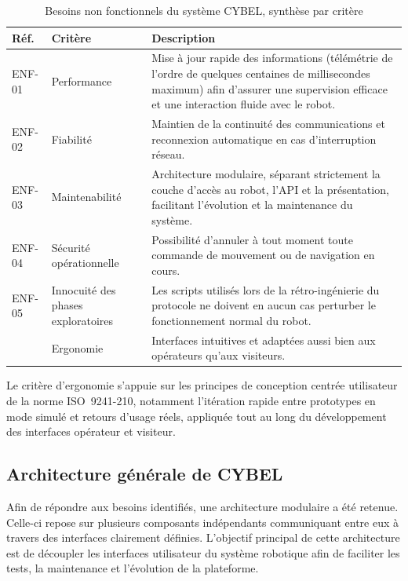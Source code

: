 \begin{table}[H]
\centering
\caption{Besoins non fonctionnels du système CYBEL, synthèse par critère}
\label{tab:besoins_non_fonctionnels_synth}
\begin{tabularx}{\textwidth}{|p{1.3cm}|p{3.3cm}|X|}
\hline
\textbf{Réf.} & \textbf{Critère} & \textbf{Description} \\
\hline
ENF-01 & Performance &
Mise à jour rapide des informations (télémétrie de l'ordre de quelques
centaines de millisecondes maximum) afin d'assurer une supervision efficace
et une interaction fluide avec le robot. \\
\hline
ENF-02 & Fiabilité &
Maintien de la continuité des communications et reconnexion automatique en
cas d'interruption réseau. \\
\hline
ENF-03 & Maintenabilité &
Architecture modulaire, séparant strictement la couche d'accès au robot,
l'API et la présentation, facilitant l'évolution et la maintenance du
système. \\
\hline
ENF-04 & Sécurité opérationnelle &
Possibilité d'annuler à tout moment toute commande de mouvement ou de
navigation en cours. \\
\hline
ENF-05 & Innocuité des phases exploratoires &
Les scripts utilisés lors de la rétro-ingénierie du protocole ne doivent en
aucun cas perturber le fonctionnement normal du robot. \\
\hline
& Ergonomie &
Interfaces intuitives et adaptées aussi bien aux opérateurs qu'aux
visiteurs. \\
\hline
\end{tabularx}
\end{table}

Le critère d'ergonomie s'appuie sur les principes de conception centrée
utilisateur de la norme ISO~9241-210, notamment l'itération rapide entre
prototypes en mode simulé et retours d'usage réels, appliquée tout au long
du développement des interfaces opérateur et visiteur.

\subsection{Architecture générale de CYBEL}

Afin de répondre aux besoins identifiés, une architecture modulaire a été
retenue. Celle-ci repose sur plusieurs composants indépendants
communiquant entre eux à travers des interfaces clairement définies.
L'objectif principal de cette architecture est de découpler les interfaces
utilisateur du système robotique afin de faciliter les tests, la
maintenance et l'évolution de la plateforme.

